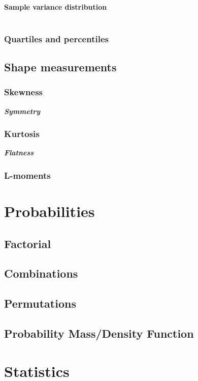 \documentclass{report}
\newcommand{\notefor}[1]{\hfill\textbf{\textit{#1}}}
\begin{document}
			\subsubsection{Sample variance distribution}
			
			\begin{verbatim}
			\end{verbatim}
		
		\subsection{Quartiles and percentiles}
		
	\section{Shape measurements}
		\subsection{Skewness}
		\notefor{Symmetry}
		
		\subsection{Kurtosis}
		\notefor{Flatness}
		
		\subsection{L-moments}

\chapter{Probabilities}
	\section{Factorial}
	\section{Combinations}
	\section{Permutations}
	\section{Probability Mass/Density Function}

\chapter{Statistics}
\end{document}
